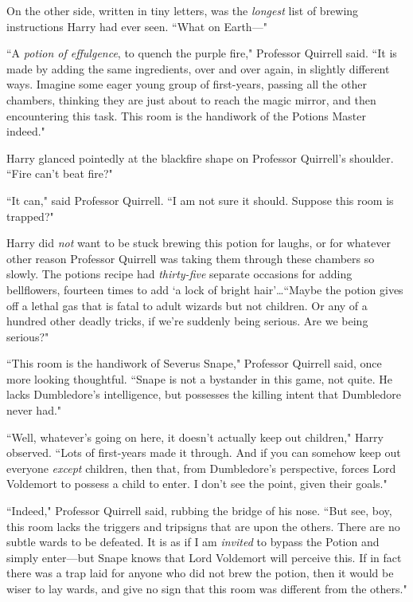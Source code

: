 On the other side, written in tiny letters, was the \emph{longest} list of brewing instructions Harry had ever seen. ``What on Earth—"

``A \emph{potion of effulgence}, to quench the purple fire," Professor Quirrell said. ``It is made by adding the same ingredients, over and over again, in slightly different ways. Imagine some eager young group of first-years, passing all the other chambers, thinking they are just about to reach the magic mirror, and then encountering this task. This room is the handiwork of the Potions Master indeed."

Harry glanced pointedly at the blackfire shape on Professor Quirrell's shoulder. ``Fire can't beat fire?"

``It can," said Professor Quirrell. ``I am not sure it should. Suppose this room is trapped?"

Harry did \emph{not} want to be stuck brewing this potion for laughs, or for whatever other reason Professor Quirrell was taking them through these chambers so slowly. The potions recipe had \emph{thirty-five} separate occasions for adding bellflowers, fourteen times to add `a lock of bright hair'…``Maybe the potion gives off a lethal gas that is fatal to adult wizards but not children. Or any of a hundred other deadly tricks, if we're suddenly being serious. Are we being serious?"

``This room is the handiwork of Severus Snape," Professor Quirrell said, once more looking thoughtful. ``Snape is not a bystander in this game, not quite. He lacks Dumbledore's intelligence, but possesses the killing intent that Dumbledore never had."

``Well, whatever's going on here, it doesn't actually keep out children," Harry observed. ``Lots of first-years made it through. And if you can somehow keep out everyone \emph{except} children, then that, from Dumbledore's perspective, forces Lord Voldemort to possess a child to enter. I don't see the point, given their goals."

``Indeed," Professor Quirrell said, rubbing the bridge of his nose. ``But see, boy, this room lacks the triggers and tripsigns that are upon the others. There are no subtle wards to be defeated. It is as if I am \emph{invited} to bypass the Potion and simply enter—but Snape knows that Lord Voldemort will perceive this. If in fact there was a trap laid for anyone who did not brew the potion, then it would be wiser to lay wards, and give no sign that this room was different from the others."

